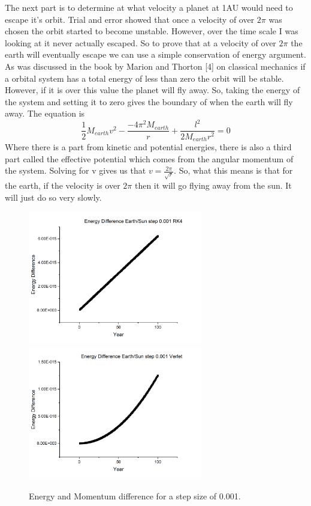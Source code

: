 \documentclass[12pt,righttag]{article}
\begin{document}
The next part is to determine at what velocity a planet at 1AU would need to escape it's orbit. Trial and error showed that once a velocity of over $2\pi$ was chosen the orbit started to become unstable. However, over the time scale I was looking at it never actually escaped. So to prove that at a velocity of over $2\pi$ the earth will eventually escape we can use a simple conservation of energy argument. As was discussed in the book by Marion and Thorton [4] on classical mechanics if a orbital system has a total energy of less than zero the orbit will be stable. However, if it is over this value the planet will fly away. So, taking the energy of the system and setting it to zero gives the boundary of when the earth will fly away. The equation is 
\[\frac{1}{2}M_{earth}v^2 - \frac{-4\pi^2M_{earth}}{r}+\frac{l^2}{2M_{earth}r^2}=0\]
Where there is a part from kinetic and potential energies, there is also a third part called the effective potential which comes from the angular momentum of the system. Solving for v gives us that $v=\frac{2\pi}{\sqrt{r}}$. So, what this means is that for the earth, if the velocity is over $2\pi$ then it will go flying away from the sun. It will just do so very slowly.




		
		\begin{figure}
				
	\includegraphics[width=3in]{Graph3.png}
	\includegraphics[width=3in]{Graph7.png}
		\caption{\label{Stability} Energy and Momentum difference for a step size of 0.001. }
		
		\end{figure}	
\end{document}
